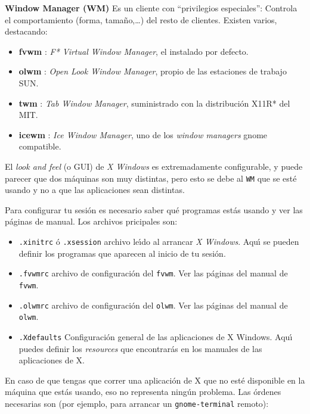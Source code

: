 \noindent
{\bf Window Manager (WM)} Es un cliente con ``privilegios especiales'':
Controla el comportamiento (forma, tama{\~n}o,\ldots) del resto de
clientes. 
Existen varios, destacando:
\begin{itemize} 
\item {\bf fvwm} : {\it F* Virtual Window Manager}, el instalado por
defecto.
\item {\bf olwm} : {\it Open Look Window Manager}, propio de  las
  estaciones de trabajo SUN.
\item {\bf twm} : {\it Tab Window Manager}, suministrado con la
  distribuci{\'o}n X11R* del MIT.
\item {\bf icewm} : {\it Ice Window Manager}, uno de los {\it window
    managers} gnome compatible.
\end{itemize}

El {\it look and feel} (o GUI) de {\it X Windows} es extremadamente
configurable, y puede parecer que dos m{\'a}quinas son muy distintas, pero esto se debe al
\verb+WM+ que se est{\'e} usando y no a que las aplicaciones sean distintas.

Para configurar tu sesi{\'o}n es necesario saber qu{\'e} programas est{\'a}s
usando y ver las p{\'a}ginas de manual. Los archivos pricipales son:

\begin{itemize}    
\item \verb+.xinitrc+ {\'o} \verb+.xsession+ archivo le{\'\i}do al arrancar
  {\it X Windows}.  Aqu{\'\i} se pueden definir los programas que aparecen al inicio de tu
  sesi{\'o}n.  
\item \verb+.fvwmrc+ archivo de configuraci{\'o}n del \verb+fvwm+. Ver las
  p{\'a}ginas del manual de \verb+fvwm+.
  
\item \verb+.olwmrc+ archivo de configuraci{\'o}n del \verb+olwm+. Ver las
  p{\'a}ginas del manual de \verb+olwm+.
  
\item \verb+.Xdefaults+ Configuraci{\'o}n general de las aplicaciones de 
X Windows. Aqu{\'\i} puedes definir los {\it resources} que encontrar{\'a}s en
  los manuales de las aplicaciones de X.  

\end{itemize}
    
  En caso de que tengas que correr una aplicaci{\'o}n de X que no est{\'e}
  disponible en la m{\'a}quina que est{\'a}s usando, eso no representa ning{\'u}n
  problema. Las {\'o}rdenes necesarias son (por ejemplo, para arrancar un
  \verb+gnome-terminal+ remoto):

